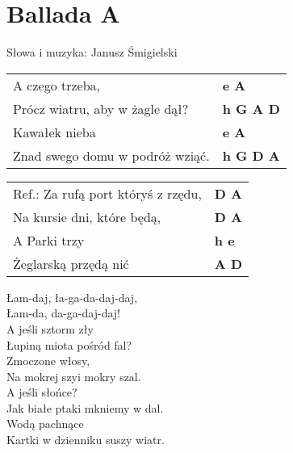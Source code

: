 \section{Ballada A}

Słowa i muzyka: Janusz Śmigielski \\

\vspace{2em}
\begin{tabular}{@{}p{9cm}@{}l@{}}
A czego trzeba, & \bfseries e A \\
Prócz wiatru, aby w żagle dął? & \bfseries h G A D \\
Kawałek nieba & \bfseries e A \\
Znad swego domu w podróż wziąć. & \bfseries h G D A \\
\end{tabular}

\vspace{1em}
\begin{tabular}{@{}p{9cm}@{}l@{}}
Ref.: Za rufą port któryś z rzędu, & \bfseries D A \\
Na kursie dni, które będą, & \bfseries D A \\
A Parki trzy & \bfseries h e \\
Żeglarską przędą nić & \bfseries A D \\
\end{tabular}

\vspace{1em}
Łam-daj, ła-ga-da-daj-daj, \\
Łam-da, da-ga-daj-daj! \\

A jeśli sztorm zły \\
Łupiną miota pośród fal? \\
Zmoczone włosy, \\
Na mokrej szyi mokry szal. \\

A jeśli słońce? \\
Jak białe ptaki mkniemy w dal. \\
Wodą pachnące \\
Kartki w dzienniku suszy wiatr. \\